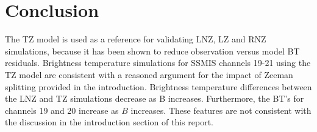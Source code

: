 \section{Conclusion}
The TZ model is used as a reference for validating LNZ, LZ and RNZ simulations, because it has been shown to reduce observation versus model BT residuals. Brightness temperature simulations for SSMIS channels 19-21 using the TZ model are consistent with a reasoned argument for the impact of Zeeman splitting provided in the introduction. Brightness temperature differences between the LNZ and TZ simulations decrease as B increases. Furthermore, the BT's for channels 19 and 20 increase as $B$ increases. These features are not consistent with the discussion in the introduction section of this report.



	


